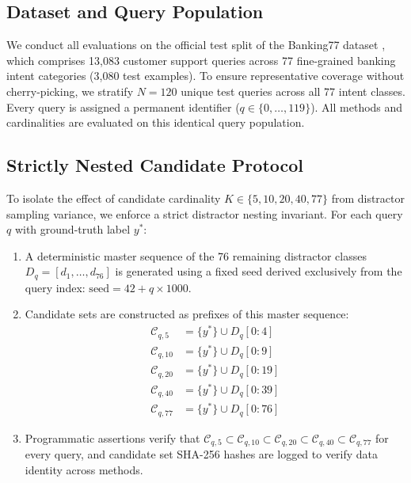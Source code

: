 \documentclass[11pt,a4paper]{article}
\begin{document}
\subsection{Dataset and Query Population}
We conduct all evaluations on the official test split of the Banking77 dataset \citep{casanueva2020efficient}, which comprises 13,083 customer support queries across 77 fine-grained banking intent categories (3,080 test examples). To ensure representative coverage without cherry-picking, we stratify $N=120$ unique test queries across all 77 intent classes. Every query is assigned a permanent identifier ($q \in \{0, \dots, 119\}$). All methods and cardinalities are evaluated on this identical query population.

\subsection{Strictly Nested Candidate Protocol}
To isolate the effect of candidate cardinality $K \in \{5, 10, 20, 40, 77\}$ from distractor sampling variance, we enforce a strict distractor nesting invariant. For each query $q$ with ground-truth label $y^*$:
\begin{enumerate}
    \item A deterministic master sequence of the 76 remaining distractor classes $D_q = [d_1, \dots, d_{76}]$ is generated using a fixed seed derived exclusively from the query index: $\text{seed} = 42 + q \times 1000$.
    \item Candidate sets are constructed as prefixes of this master sequence:
    \begin{align}
        \mathcal{C}_{q, 5} &= \{y^*\} \cup D_q[0:4] \\
        \mathcal{C}_{q, 10} &= \{y^*\} \cup D_q[0:9] \\
        \mathcal{C}_{q, 20} &= \{y^*\} \cup D_q[0:19] \\
        \mathcal{C}_{q, 40} &= \{y^*\} \cup D_q[0:39] \\
        \mathcal{C}_{q, 77} &= \{y^*\} \cup D_q[0:76]
    \end{align}
    \item Programmatic assertions verify that $\mathcal{C}_{q, 5} \subset \mathcal{C}_{q, 10} \subset \mathcal{C}_{q, 20} \subset \mathcal{C}_{q, 40} \subset \mathcal{C}_{q, 77}$ for every query, and candidate set SHA-256 hashes are logged to verify data identity across methods.
\end{enumerate}
\end{document}
